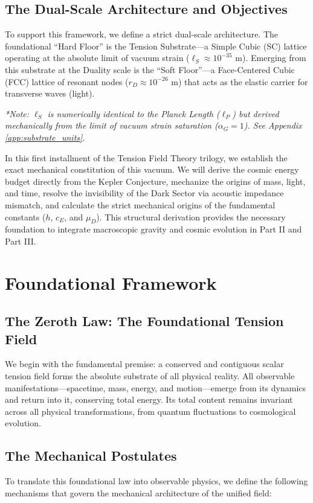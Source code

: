 \section{The Dual-Scale Architecture and Objectives}
To support this framework, we define a strict dual-scale architecture. The foundational ``Hard Floor'' is the Tension Substrate---a Simple Cubic (SC) lattice operating at the absolute limit of vacuum strain ($\ell_S \approx 10^{-35} \text{ m}$). Emerging from this substrate at the Duality scale is the ``Soft Floor''---a Face-Centered Cubic (FCC) lattice of resonant nodes ($r_D \approx 10^{-26} \text{ m}$) that acts as the elastic carrier for transverse waves (light). 

\textit{*Note: $\ell_S$ is numerically identical to the Planck Length ($\ell_P$) but derived mechanically from the limit of vacuum strain saturation ($\alpha_G = 1$). See Appendix \ref{app:substrate_units}.}

In this first installment of the Tension Field Theory trilogy, we establish the exact mechanical constitution of this vacuum. We will derive the cosmic energy budget directly from the Kepler Conjecture, mechanize the origins of mass, light, and time, resolve the invisibility of the Dark Sector via acoustic impedance mismatch, and calculate the strict mechanical origins of the fundamental constants ($h$, $c_E$, and $\mu_D$). This structural derivation provides the necessary foundation to integrate macroscopic gravity and cosmic evolution in Part II and Part III.

\chapter{Foundational Framework}

\section{The Zeroth Law: The Foundational Tension Field}
We begin with the fundamental premise: a conserved and contiguous scalar tension field forms the absolute substrate of all physical reality. All observable manifestations---spacetime, mass, energy, and motion---emerge from its dynamics and return into it, conserving total energy. Its total content remains invariant across all physical transformations, from quantum fluctuations to cosmological evolution.

\section{The Mechanical Postulates}
To translate this foundational law into observable physics, we define the following mechanisms that govern the mechanical architecture of the unified field:

